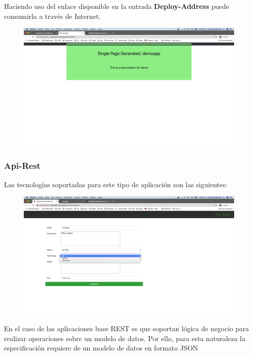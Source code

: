 \documentclass[a4paper,11pt]{book}
\begin{document}
 Haciendo uso del enlace disponible en la entrada \textbf{Deploy-Address} puede consumirla a través de Internet. 

\begin{figure}[H]
\centering
\includegraphics[scale=0.2]{imagenes/casouso/17.png}
\caption{   }
\end{figure}

\subsubsection{Api-Rest}

Las tecnologías soportadas para este tipo de aplicación son las siguientes: 

\begin{figure}[H]
\centering
\includegraphics[scale=0.2]{imagenes/casouso/18.png}
\caption{   }
\end{figure}

En el caso de las aplicaciones base REST es que soportan lógica de negocio para realizar operaciones sobre un modelo de datos. Por ello, para esta naturaleza la especificación requiere de un modelo de datos en formato JSON
\end{document}

